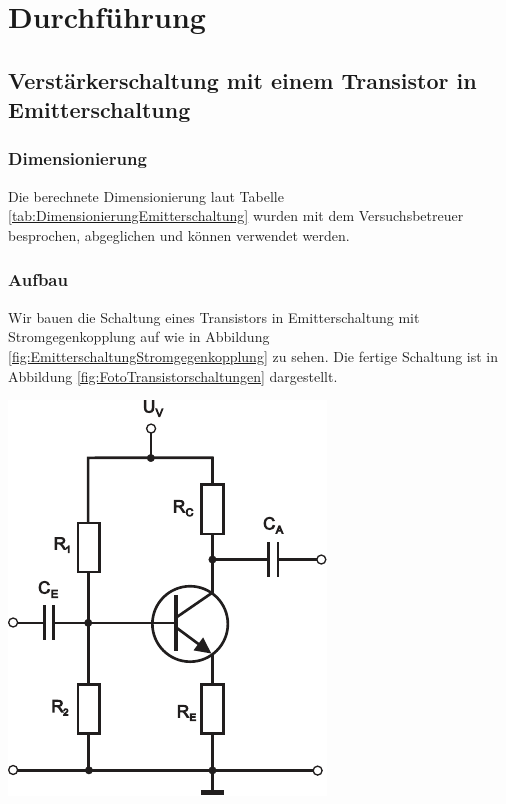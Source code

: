 \section{Durchführung}
%
\subsection{Verstärkerschaltung mit einem Transistor in Emitterschaltung}
%
\subsubsection*{Dimensionierung}
%
Die berechnete Dimensionierung laut Tabelle \ref{tab:DimensionierungEmitterschaltung} wurden mit dem Versuchsbetreuer besprochen, abgeglichen und können verwendet werden.
%
\subsubsection*{Aufbau}
%
Wir bauen die Schaltung eines Transistors in Emitterschaltung mit Stromgegenkopplung auf wie in Abbildung \ref{fig:EmitterschaltungStromgegenkopplung} zu sehen.
Die fertige Schaltung ist in Abbildung \ref{fig:FotoTransistorschaltungen} dargestellt.
%
\par
%
\minipage{\linewidth}
    \begin{center}
        \captionsetup{type=figure}
        \begin{adjustbox}{max width=\linewidth, keepaspectratio}
            \includegraphics[]{pdf/EmitterschaltungStromgegenkopplung}
        \end{adjustbox}
        \label{fig:EmitterschaltungStromgegenkopplung}
    \end{center}
